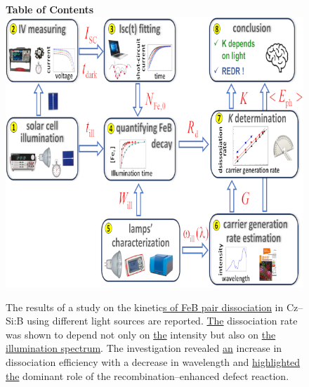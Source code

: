 \documentclass{WileyMSP-template}
\begin{document}




%
%
\begin{figure}
\textbf{Table of Contents}\\
\medskip
  \includegraphics{toc-image.png}
  \medskip
  \caption*{The results of a study on the kinetic\textcolor[rgb]{0.00,0.07,1.00}{\uline{s of FeB pair dissociation}} in Cz--Si:B using different light sources are reported.
  \textcolor[rgb]{0.00,0.07,1.00}{\uline{The}} dissociation rate was shown to depend not only on \textcolor[rgb]{0.00,0.07,1.00}{\uline{the}} intensity but also on 
  \textcolor[rgb]{0.00,0.07,1.00}{\uline{the illumination spectrum}}.
  The investigation revealed \textcolor[rgb]{0.00,0.07,1.00}{\uline{an}} increase in dissociation efficiency with a decrease in wavelength and 
  \textcolor[rgb]{0.00,0.07,1.00}{\uline{highlighted the}} dominant role of the recombination--enhanced defect reaction.}
\end{figure}
\end{document}
